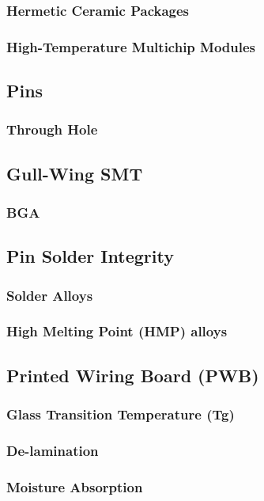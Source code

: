 \documentclass{article}
\begin{document}
	\subsubsection{Hermetic Ceramic Packages}
	\subsubsection{High-Temperature Multichip Modules}
	
\subsection{Pins}
	\subsubsection{Through Hole}
	\subsection{Gull-Wing SMT}
	\subsubsection{BGA}
	
\subsection{Pin Solder Integrity}
	\subsubsection{Solder Alloys}
	\subsubsection{High Melting Point (HMP) alloys}
	
\subsection{Printed Wiring Board (PWB)}
	\subsubsection{Glass Transition Temperature (Tg)}
	\subsubsection{De-lamination}
	\subsubsection{Moisture Absorption}
\end{document}
